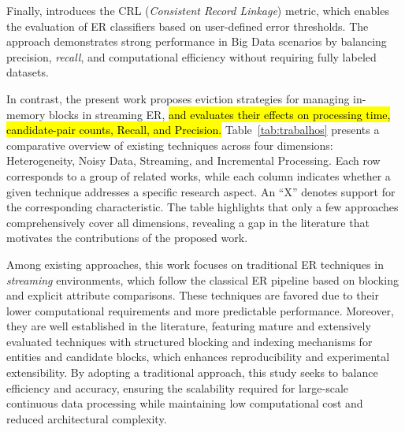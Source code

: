 \documentclass{ieeeaccess}
\begin{document}
Finally, \cite{10.1145/3786768} introduces the CRL (\textit{Consistent Record Linkage}) metric, which enables the evaluation of ER classifiers based on user-defined error thresholds. The approach demonstrates strong performance in Big Data scenarios by balancing precision, \textit{recall}, and computational efficiency without requiring fully labeled datasets.

In contrast, the present work proposes eviction strategies for managing in-memory blocks in streaming ER, \hl{and evaluates their effects on processing time, candidate-pair counts, Recall, and Precision.} Table~\ref{tab:trabalhos} presents a comparative overview of existing techniques across four dimensions: Heterogeneity, Noisy Data, Streaming, and Incremental Processing. Each row corresponds to a group of related works, while each column indicates whether a given technique addresses a specific research aspect. An “X” denotes support for the corresponding characteristic. The table highlights that only a few approaches comprehensively cover all dimensions, revealing a gap in the literature that motivates the contributions of the proposed work.

Among existing approaches, this work focuses on traditional ER techniques in \textit{streaming} environments, which follow the classical ER pipeline based on blocking and explicit attribute comparisons. These techniques are favored due to their lower computational requirements and more predictable performance. Moreover, they are well established in the literature, featuring mature and extensively evaluated techniques with structured blocking and indexing mechanisms for entities and candidate blocks, which enhances reproducibility and experimental extensibility. By adopting a traditional approach, this study seeks to balance efficiency and accuracy, ensuring the scalability required for large-scale continuous data processing while maintaining low computational cost and reduced architectural complexity.
\end{document}
